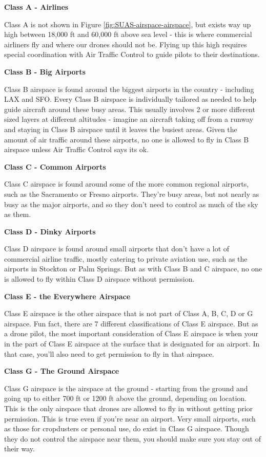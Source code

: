 \documentclass[
  12pt,
]{book}
\begin{document}
\textbf{Class A - Airlines}

Class A is not shown in Figure \ref{fig:SUAS-airspace-airspace}, but exists way up high between 18,000 ft and 60,000 ft above sea level - this is where commercial airliners fly and where our drones should not be. Flying up this high requires special coordination with Air Traffic Control to guide pilots to their destinations.

\textbf{Class B - Big Airports}

Class B airspace is found around the biggest airports in the country - including LAX and SFO. Every Class B airspace is individually tailored as needed to help guide aircraft around these busy areas. This usually involves 2 or more different sized layers at different altitudes - imagine an aircraft taking off from a runway and staying in Class B airspace until it leaves the busiest areas. Given the amount of air traffic around these airports, no one is allowed to fly in Class B airspace unless Air Traffic Control says its ok.

\textbf{Class C - Common Airports}

Class C airspace is found around some of the more common regional airports, such as the Sacramento or Fresno airports. They're busy areas, but not nearly as busy as the major airports, and so they don't need to control as much of the sky as them.

\textbf{Class D - Dinky Airports}

Class D airspace is found around small airports that don't have a lot of commercial airline traffic, mostly catering to private aviation use, such as the airports in Stockton or Palm Springs. But as with Class B and C airspace, no one is allowed to fly within Class D airspace without permission.

\textbf{Class E - the Everywhere Airspace}

Class E airspace is the other airspace that is not part of Class A, B, C, D or G airspace. Fun fact, there are 7 different classifications of Class E airspace. But as a drone pilot, the most important consideration of Class E airspace is when your in the part of Class E airspace at the surface that is designated for an airport. In that case, you'll also need to get permission to fly in that airspace.

\textbf{Class G - The Ground Airspace}

Class G airspace is the airspace at the ground - starting from the ground and going up to either 700 ft or 1200 ft above the ground, depending on location. This is the only airspace that drones are allowed to fly in without getting prior permission. This is true even if you're near an airport. Very small airports, such as those for cropdusters or personal use, do exist in Class G airspace. Though they do not control the airspace near them, you should make sure you stay out of their way.
\end{document}
